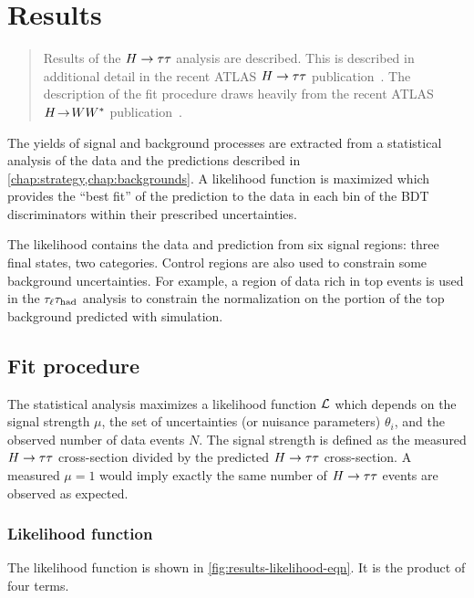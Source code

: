 \chapter[Results][Results]{Results}
\label{chap:results}

\begin{quote}
  Results of the $H\rightarrow\tau\tau$ analysis are described. This is described in additional detail in the recent ATLAS $H\rightarrow\tau\tau$ publication~\cite{HIGG-2013-32}. The description of the fit procedure draws heavily from the recent ATLAS $H \!\rightarrow\! WW^\ast$ publication~\cite{HIGG-2013-13}.
\end{quote}

The yields of signal and background processes are extracted from a statistical analysis of the data and the predictions described in \cref{chap:strategy,chap:backgrounds}. A likelihood function is maximized which provides the ``best fit'' of the prediction to the data in each bin of the BDT discriminators within their prescribed uncertainties.

The likelihood contains the data and prediction from six signal regions: three final states, two categories. Control regions are also used to constrain some background uncertainties. For example, a region of data rich in top events is used in the $\tau_\ell\tau_\text{had}$ analysis to constrain the normalization on the portion of the top background predicted with simulation.

\section{Fit procedure}
\label{sec:results-fit-procedure}

The statistical analysis maximizes a likelihood function $\mathcal{L}$ which depends on the signal strength $\mu$, the set of uncertainties (or nuisance parameters) $\theta_i$, and the observed number of data events $N$. The signal strength is defined as the measured $H\rightarrow\tau\tau$ cross-section divided by the predicted $H\rightarrow\tau\tau$ cross-section. A measured $\mu=1$ would imply exactly the same number of $H\rightarrow\tau\tau$ events are observed as expected.

\subsection{Likelihood function}

The likelihood function is shown in \cref{fig:results-likelihood-eqn}. It is the product of four terms.
%

